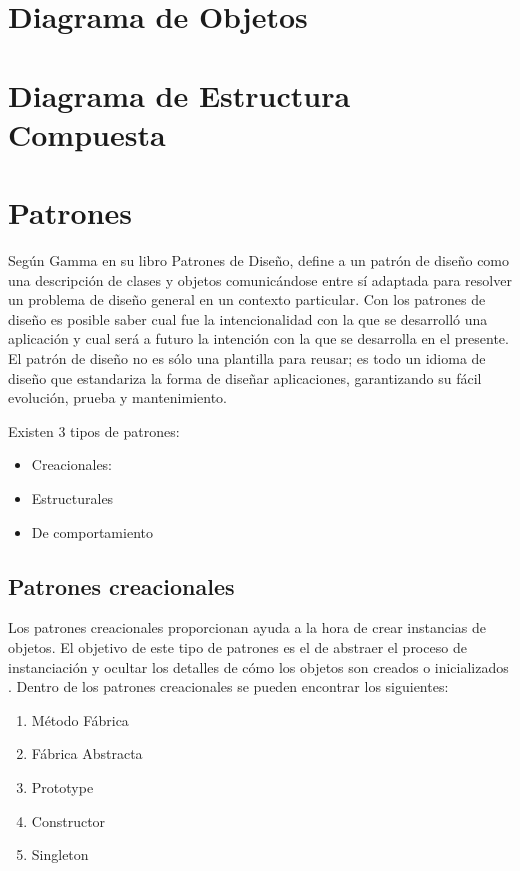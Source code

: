 \section{Diagrama de Objetos}

\newpage

\section{Diagrama de Estructura Compuesta}

\newpage

\section{Patrones}
Según Gamma en su libro Patrones de Diseño, define a un patrón de diseño como una descripción
de clases y objetos comunicándose
entre sí adaptada para resolver un
problema de diseño general en un
contexto particular. Con los patrones de diseño es posible saber cual fue la intencionalidad con la que se desarrolló una aplicación y cual será a futuro la intención con la que se desarrolla en el presente. El patrón de diseño no es sólo una plantilla para reusar; es todo un idioma de diseño que estandariza la forma de diseñar aplicaciones, garantizando su fácil evolución, prueba y mantenimiento\cite{Bol_2014}.

Existen 3 tipos de patrones:
\begin{itemize}
\item Creacionales: 
\item Estructurales
\item De comportamiento
\end{itemize}
\subsection{Patrones creacionales}
Los patrones creacionales proporcionan ayuda a la hora de crear instancias de objetos. El objetivo
de este tipo de patrones es el de abstraer el proceso de instanciación y ocultar los detalles de cómo los objetos
son creados o inicializados \cite{Bol_2014}.
Dentro de los patrones creacionales se pueden encontrar los siguientes:
\begin{enumerate}
\item Método Fábrica
\item Fábrica Abstracta
\item Prototype
\item Constructor
\item Singleton
\end{enumerate}

